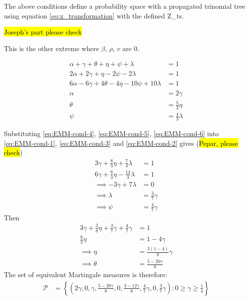 \documentclass{article}
\begin{document}
The above conditions define a probability space with a propagated trinomial tree using equation \ref{eq:x_transformation} with the defined Z_ts.

\hl{Joseph's part please check}

This is the other extreme where $\beta$, $\rho$, $v$ are 0. 

\begin{align}
    \alpha+\gamma+\theta+\eta+\psi+\lambda & = 1 \label{eq:EMM-cond-1} \\
    2\alpha+2\gamma + \eta - 2\psi - 2\lambda & = 1 \label{eq:EMM-cond-2}\\
    6\alpha - 6\gamma + 4\theta -4\eta -10\psi + 10\lambda & = 1 \label{eq:EMM-cond-3}\\
    \alpha & = 2\gamma \label{eq:EMM-cond-4}\\
    \theta & = \frac{5}{3}\eta \label{eq:EMM-cond-5}\\
    \psi & = \frac{4}{3}\lambda \label{eq:EMM-cond-6}
\end{align}

Substituting \ref{eq:EMM-cond-4}, \ref{eq:EMM-cond-5}, \ref{eq:EMM-cond-6} into \ref{eq:EMM-cond-1}, \ref{eq:EMM-cond-3} and \ref{eq:EMM-cond-2} gives (\hl{Pepar, please check})
\begin{align*}
    3\gamma + \frac{8}{3}\eta + \frac{7}{3}\lambda & = 1 \\
    6\gamma + \frac{8}{3}\eta - \frac{14}{3}\lambda & = 1 \\
    \implies -3\gamma + 7\lambda & = 0 \\
    \implies \lambda & = \frac{3}{7}\gamma \\
    \implies \psi & = \frac{4}{7}\gamma
\end{align*}
Then
\begin{align*}
    3\gamma+\frac{3}{8}\eta + \frac{3}{7}\gamma + \frac{4}{7}\gamma & = 1 \\
    \frac{8}{3}\eta & = 1 - 4\gamma \\
    \implies \eta & = \frac{3(1-4)}{8}\gamma \\
    \implies \theta & = \frac{5-20\gamma}{8}
\end{align*}
The set of equivalent Martingale measures is therefore:
\begin{align*}
    \mathcal{P} & =\left\{ \left(2\gamma,0,\gamma,\frac{5-20\gamma}{8},0,\frac{3-12\gamma}{8},\frac{4}{7}\gamma,0,\frac{3}{7}\gamma\right): 0\ge\gamma\ge\frac{1}{4}\right\}
\end{align*}
\end{document}
